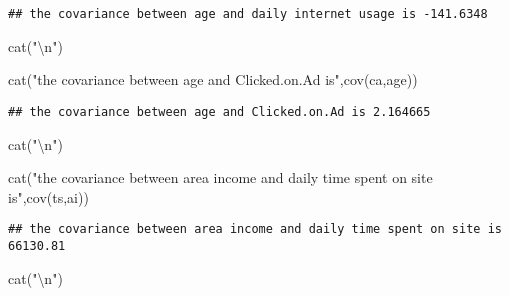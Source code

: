 \documentclass[
]{article}
\newenvironment{Shaded}{\begin{snugshade}}{\end{snugshade}}
\newcommand{\FunctionTok}[1]{\textcolor[rgb]{0.00,0.00,0.00}{#1}}
\newcommand{\NormalTok}[1]{#1}
\newcommand{\SpecialCharTok}[1]{\textcolor[rgb]{0.00,0.00,0.00}{#1}}
\newcommand{\StringTok}[1]{\textcolor[rgb]{0.31,0.60,0.02}{#1}}
\begin{document}
\begin{verbatim}
## the covariance between age and daily internet usage is -141.6348
\end{verbatim}

\begin{Shaded}
\begin{Highlighting}[]
\FunctionTok{cat}\NormalTok{(}\StringTok{"}\SpecialCharTok{\textbackslash{}n}\StringTok{"}\NormalTok{)}
\end{Highlighting}
\end{Shaded}

\begin{Shaded}
\begin{Highlighting}[]
\FunctionTok{cat}\NormalTok{(}\StringTok{"the covariance between age and Clicked.on.Ad is"}\NormalTok{,}\FunctionTok{cov}\NormalTok{(ca,age))}
\end{Highlighting}
\end{Shaded}

\begin{verbatim}
## the covariance between age and Clicked.on.Ad is 2.164665
\end{verbatim}

\begin{Shaded}
\begin{Highlighting}[]
\FunctionTok{cat}\NormalTok{(}\StringTok{"}\SpecialCharTok{\textbackslash{}n}\StringTok{"}\NormalTok{)}
\end{Highlighting}
\end{Shaded}

\begin{Shaded}
\begin{Highlighting}[]
\FunctionTok{cat}\NormalTok{(}\StringTok{"the covariance between area income and daily time spent on site is"}\NormalTok{,}\FunctionTok{cov}\NormalTok{(ts,ai))}
\end{Highlighting}
\end{Shaded}

\begin{verbatim}
## the covariance between area income and daily time spent on site is 66130.81
\end{verbatim}

\begin{Shaded}
\begin{Highlighting}[]
\FunctionTok{cat}\NormalTok{(}\StringTok{"}\SpecialCharTok{\textbackslash{}n}\StringTok{"}\NormalTok{)}
\end{Highlighting}
\end{Shaded}
\end{document}
